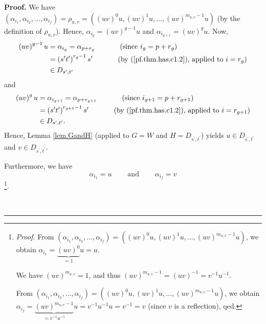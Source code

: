 \documentclass
[numbers=enddot,12pt,final,onecolumn,notitlepage,abstracton]{scrartcl}%
\theoremstyle{definition}
\newenvironment{proof}[1][Proof]{\noindent\textbf{#1.} }{\ \rule{0.5em}{0.5em}}
\begin{document}
\begin{proof}
We have $\left(  \alpha_{i_{1}},\alpha_{i_{2}},\ldots,\alpha_{i_{f}}\right)
=\rho_{u,v}=\left(  \left(  uv\right)  ^{0}u,\left(  uv\right)  ^{1}%
u,\ldots,\left(  uv\right)  ^{m_{u,v}-1}u\right)  $ (by the definition of
$\rho_{u,v}$). Hence, $\alpha_{i_{g}}=\left(  uv\right)  ^{g-1}u$ and
$\alpha_{i_{g+1}}=\left(  uv\right)  ^{g}u$. Now,%
\begin{align*}
\left(  uv\right)  ^{g-1}u  &  =\alpha_{i_{g}}=\alpha_{p+r_{g}}%
\ \ \ \ \ \ \ \ \ \ \left(  \text{since }i_{g}=p+r_{g}\right) \\
&  =\left(  s^{\prime}t^{\prime}\right)  ^{r_{g}-1}s^{\prime}%
\ \ \ \ \ \ \ \ \ \ \left(  \text{by (\ref{pf.thm.has.c1.2}), applied to
}i=r_{g}\right) \\
&  \in D_{s^{\prime},t^{\prime}}%
\end{align*}
and%
\begin{align*}
\left(  uv\right)  ^{g}u  &  =\alpha_{i_{g+1}}=\alpha_{p+r_{g+1}%
}\ \ \ \ \ \ \ \ \ \ \left(  \text{since }i_{g+1}=p+r_{g+1}\right) \\
&  =\left(  s^{\prime}t^{\prime}\right)  ^{r_{g+1}-1}s^{\prime}%
\ \ \ \ \ \ \ \ \ \ \left(  \text{by (\ref{pf.thm.has.c1.2}), applied to
}i=r_{g+1}\right) \\
&  \in D_{s^{\prime},t^{\prime}}.
\end{align*}
Hence, Lemma \ref{lem.GandH} (applied to $G=W$ and $H=D_{s^{\prime},t^{\prime
}}$) yields $u\in D_{s^{\prime},t^{\prime}}$ and $v\in D_{s^{\prime}%
,t^{\prime}}$.

Furthermore, we have%
\[
\alpha_{i_{1}}=u\ \ \ \ \ \ \ \ \ \ \text{and}\ \ \ \ \ \ \ \ \ \ \alpha
_{i_{f}}=v
\]
\footnote{\textit{Proof.} From $\left(  \alpha_{i_{1}},\alpha_{i_{2}}%
,\ldots,\alpha_{i_{f}}\right)  =\left(  \left(  uv\right)  ^{0}u,\left(
uv\right)  ^{1}u,\ldots,\left(  uv\right)  ^{m_{u,v}-1}u\right)  $, we obtain
$\alpha_{i_{1}}=\underbrace{\left(  uv\right)  ^{0}}_{=1}u=u$.
\par
We have $\left(  uv\right)  ^{m_{u,v}}=1$, and thus $\left(  uv\right)
^{m_{u,v}-1}=\left(  uv\right)  ^{-1}=v^{-1}u^{-1}$.
\par
From $\left(  \alpha_{i_{1}},\alpha_{i_{2}},\ldots,\alpha_{i_{f}}\right)
=\left(  \left(  uv\right)  ^{0}u,\left(  uv\right)  ^{1}u,\ldots,\left(
uv\right)  ^{m_{u,v}-1}u\right)  $, we obtain $\alpha_{i_{f}}%
=\underbrace{\left(  uv\right)  ^{m_{u,v}-1}}_{=v^{-1}u^{-1}}u=v^{-1}%
u^{-1}u=v^{-1}=v$ (since $v$ is a reflection), qed.}.


\end{proof}
\end{document}
